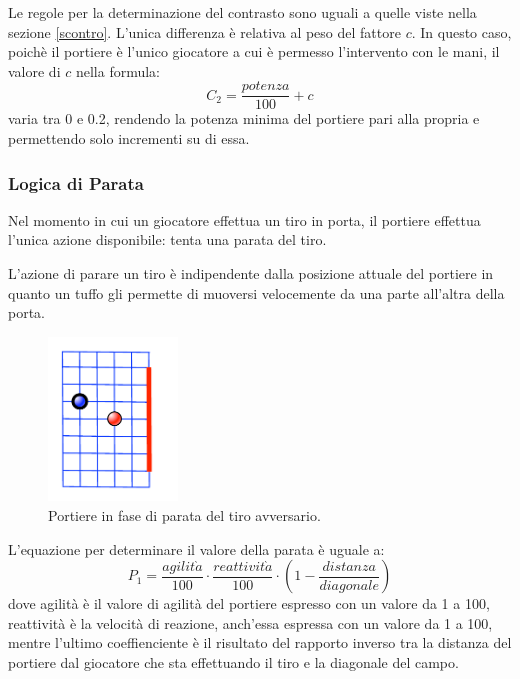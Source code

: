 \documentclass[aps,letterpaper,10pt]{article}
\begin{document}
Le regole per la determinazione del contrasto sono uguali a quelle viste nella sezione \ref{scontro}. L'unica differenza
\`e relativa al peso del fattore $c$. In questo caso, poich\`e il portiere \`e l'unico giocatore a cui \`e permesso
l'intervento con le mani, il valore di $c$ nella formula: $$ C_2 = \frac{potenza}{100} + c $$ varia tra 0 e 0.2,
rendendo la potenza minima del portiere pari alla propria e permettendo solo incrementi su di essa.

\subsubsection{Logica di Parata}
\label{parata}

Nel momento in cui un giocatore effettua un tiro in porta, il portiere effettua l'unica azione disponibile: tenta una
parata del tiro. \vspace{3mm}

L'azione di parare un tiro \`e indipendente dalla posizione attuale del portiere in quanto un tuffo gli permette di
muoversi velocemente da una parte all'altra della porta.

\begin{figure}[H]
	\begin{center}
		\includegraphics[width=130px]{images/save.pdf}
	\end{center}
\caption{Portiere in fase di parata del tiro avversario.}
\end{figure}

L'equazione per determinare il valore della parata \`e uguale a: $$ P_1 = \frac{agilit\grave{a}}{100} \cdot
\frac{reattivit\grave{a}}{100} \cdot \left( 1-\frac{distanza}{diagonale} \right) $$ dove agilit\`a \`e il valore di
agilit\`a del portiere espresso con un valore da 1 a 100, reattivit\`a \`e la velocit\`a di reazione, anch'essa espressa
con un valore da 1 a 100, mentre l'ultimo coeffienciente \`e il risultato del rapporto inverso tra la distanza del
portiere dal giocatore che sta effettuando il tiro e la diagonale del campo. \vspace{3mm}
\end{document}
